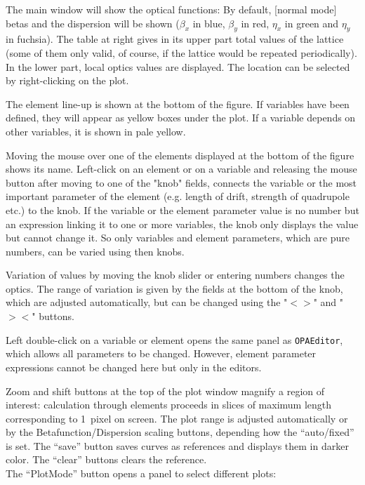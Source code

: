 \documentclass[12pt]{article}
\begin{document}
The main window will show the optical functions:
By default, [normal mode] betas and the dispersion will be shown ($\beta_x$ in blue, $\beta_y$ in red, $\eta_x$ in green and $\eta_y$ in fuchsia). The table at right gives in its upper part
total values of the lattice (some of them only valid, of course, if the lattice would
be repeated periodically). In the lower part, local optics values are displayed.
The location can be selected by right-clicking on the plot.

The element line-up is shown at the bottom of the figure. If variables have been defined, they will appear as yellow boxes under the plot. If a variable depends on other variables, it is shown in pale yellow.

Moving the mouse over one of the elements displayed at the bottom of the figure shows its name. Left-click on an element or on a variable and releasing the mouse button after moving to one
of the "knob" fields, connects the variable or the most important parameter of the element (e.g. length of drift, strength of quadrupole etc.) to the knob. If the variable or the element parameter value is no number but an expression linking it to one or more variables, the knob only displays the value but cannot change it. So only variables and element parameters, which are pure numbers, can be varied using then knobs.

Variation of values by moving the knob slider or entering numbers changes the
optics. The range of variation is given by the fields at the bottom of the knob, which
are adjusted automatically, but can be changed using the "$<>$" and "$><$" buttons.

Left double-click on a variable or element opens the same panel as {\tt OPAEditor},  which allows
all parameters to be changed. However, element parameter expressions cannot be changed here but only in the editors.

Zoom and shift buttons at the top of the plot window magnify a region of interest: calculation through elements
proceeds in slices of maximum length corresponding to 1~pixel on screen. The plot range is adjusted automatically or by the Betafunction/Dispersion scaling buttons, depending how the ``auto/fixed'' is set. 
The ``save'' button saves curves as references and displays them in darker color. The ``clear'' buttons clears the reference.\\

The ``PlotMode'' button opens a panel to select different plots:
\end{document}
